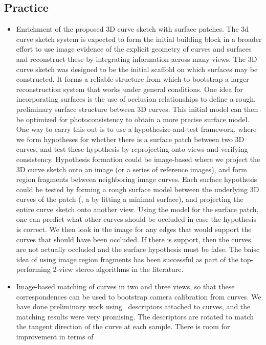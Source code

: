 \subsection{Practice}
\begin{itemize}
\item Enrichment of the proposed 3D curve sketch with surface patches. 
The 3d curve sketch system is expected to form the initial building block in a broader effort to use
image evidence of the explicit geometry of curves and surfaces and reconstruct
these by integrating information across many views. The 3D curve sketch was
designed to be the initial scaffold on which surfaces may be constructed. It
forms a reliable structure from which to bootstrap a larger
reconstruction system that works under general conditions. One idea for
incorporating surfaces is the use of occlusion relationships to define a rough,
preliminary surface structure between 3D curves. This initial model can
then be optimized for photoconsistency to obtain a more precise surface model.
One way to carry this out is to use a hypothesize-and-test framework, where we
form hypotheses for whether there is a surface patch between two 3D curves, and
test these hypothesis by reprojecting onto views and verifying consistency.
Hypothesis formation could be image-based where we project the 3D curve sketch
onto an image (or a series of reference images), and form region fragments
between neighboring image curves. Each surface hypothesis could be tested by
forming a rough surface model between the underlying 3D curves of the patch
(\eg, a by fitting a minimal surface), and projecting the entire curve sketch
onto another view. Using the model for the surface patch, one can predict what
other curves should be occluded in case the hypothesis is correct. We then look
in the image for any edges that would support the curves that should have been
occluded. If there is support, then the curves are not actually occluded and the
surface hypothesis must be false.  The baisc idea of using image region
fragments has been successful as part of the top-performing 2-view stereo
algorithms in the literature.   
\item Image-based matching of curves in two and three views, so that these
correspondences can be used to bootstrap camera calibration from curves. 
We have done preliminary work using \sift\ descriptors attached to curves, and the
matching results were very promising. The descriptors are rotated to match the
tangent direction of the curve at each sample. There is room for improvement in terms of

\end{itemize}
